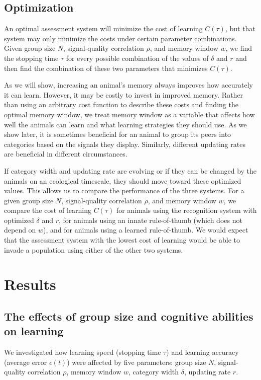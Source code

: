 \subsection{Optimization }
An optimal assessment system will minimize the cost of learning $C(\tau)$, but that system may only minimize the costs under certain parameter combinations. Given group size $N$, signal-quality correlation $\rho$, and memory window $w$, we find the stopping time $\tau$ for every possible combination of the values of $\delta$ and $r$ and then find the combination of these two parameters that minimizes $C(\tau)$.   

As we will show, increasing an animal's memory always improves how accurately it can learn. However, it may be costly to invest in improved memory. Rather than using an arbitrary cost function to describe these costs and finding the optimal memory window, we treat memory window as a variable that affects how well the animals can learn and what learning strategies they should use. As we show later, it is sometimes beneficial for an animal to group its peers into categories based on the signals they display. Similarly, different updating rates are beneficial in different circumstances. 

If category width and updating rate are evolving or if they can be changed by the animals on an ecological timescale, they should move toward these optimized values. This allows us to compare the performance of the three systems. For a given group size $N$, signal-quality correlation $\rho$, and memory window $w$, we compare the cost of learning $C(\tau)$ for animals using the recognition system with optimized $\delta$ and $r$, for animals using an innate rule-of-thumb (which does not depend on $w$), and for animals using a learned rule-of-thumb. We would expect that the assessment system with the lowest cost of learning would be able to invade a population using either of the other two systems.

\section*{Results}
\subsection*{The effects of group size and cognitive abilities on learning}
We investigated how learning speed (stopping time $\tau$) and learning accuracy (average error $\epsilon(t)$) were affected by five parameters: group size $N$, signal-quality correlation $\rho$, memory window $w$, category width $\delta$, updating rate $r$.

